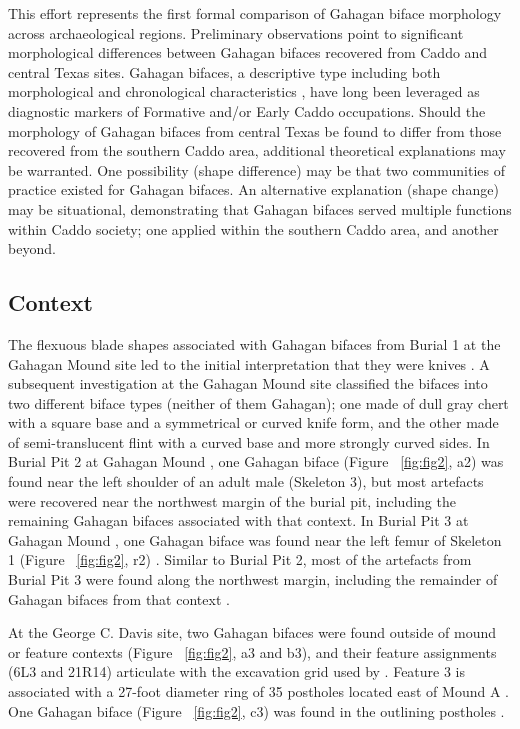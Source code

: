 \documentclass[review]{elsarticle}
\begin{document}
This effort represents the first formal comparison of Gahagan biface morphology across archaeological regions. Preliminary observations point to significant morphological differences between Gahagan bifaces recovered from Caddo and central Texas sites. Gahagan bifaces, a descriptive type including both morphological and chronological characteristics \citep{RN20847,RN4924,RN3684}, have long been leveraged as diagnostic markers of Formative and/or Early Caddo occupations. Should the morphology of Gahagan bifaces from central Texas be found to differ from those recovered from the southern Caddo area, additional theoretical explanations may be warranted. One possibility (shape difference) may be that two communities of practice existed for Gahagan bifaces. An alternative explanation (shape change) may be situational, demonstrating that Gahagan bifaces served multiple functions within Caddo society; one applied within the southern Caddo area, and another beyond.

\subsection*{Context}

The flexuous blade shapes associated with Gahagan bifaces from Burial 1 at the Gahagan Mound site led to the initial interpretation that they were knives \citep[Figures 18-21]{RN2740}. A subsequent investigation at the Gahagan Mound site \citep{RN5274} classified the bifaces into two different biface types (neither of them Gahagan); one made of dull gray chert with a square base and a symmetrical or curved knife form, and the other made of semi-translucent flint with a curved base and more strongly curved sides. In Burial Pit 2 at Gahagan Mound \citep[Plate 21]{RN5274}, one Gahagan biface (Figure ~\ref{fig:fig2}, a2) \citep[Plate 27, No. 1, 3]{RN5274} was found near the left shoulder of an adult male (Skeleton 3), but most artefacts were recovered near the northwest margin of the burial pit, including the remaining Gahagan bifaces associated with that context. In Burial Pit 3 at Gahagan Mound \citep[Plate 23, 1]{RN5274}, one Gahagan biface was found near the left femur of Skeleton 1 (Figure ~\ref{fig:fig2}, r2) \citep[Plate 27, No. 1, 2]{RN5274}. Similar to Burial Pit 2, most of the artefacts from Burial Pit 3 were found along the northwest margin, including the remainder of Gahagan bifaces from that context \citep{RN5274}.

At the George C. Davis site, two Gahagan bifaces were found outside of mound or feature contexts (Figure ~\ref{fig:fig2}, a3 and b3), and their feature assignments (6L3 and 21R14) articulate with the excavation grid used by \cite{RN800}. Feature 3 is associated with a 27-foot diameter ring of 35 postholes located east of Mound A \citep[Figure 4]{RN800}. One Gahagan biface (Figure ~\ref{fig:fig2}, c3) was found in the outlining postholes \cite{RN800}.
\end{document}

